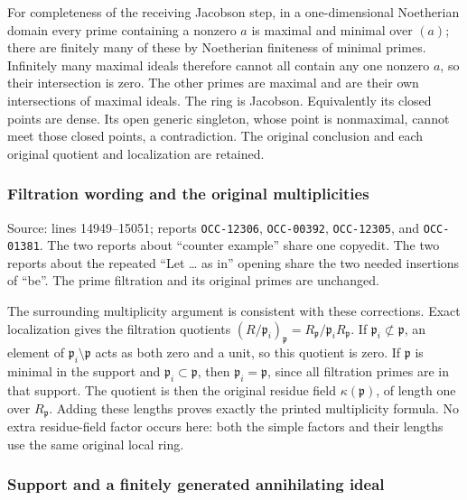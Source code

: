 For completeness of the receiving Jacobson step, in a one-dimensional Noetherian domain every prime containing a nonzero \(a\) is maximal and minimal over \((a)\); there are finitely many of these by Noetherian finiteness of minimal primes. Infinitely many maximal ideals therefore cannot all contain any one nonzero \(a\), so their intersection is zero. The other primes are maximal and are their own intersections of maximal ideals. The ring is Jacobson. Equivalently its closed points are dense. Its open generic singleton, whose point is nonmaximal, cannot meet those closed points, a contradiction. The original conclusion and each original quotient and localization are retained.

\subsubsection{Filtration wording and the original multiplicities}\label{filtration-wording-and-the-original-multiplicities}

Source: lines 14949--15051; reports \texttt{OCC-12306}, \texttt{OCC-00392}, \texttt{OCC-12305}, and \texttt{OCC-01381}. The two reports about ``counter example'' share one copyedit. The two reports about the repeated ``Let \ldots{} as in'' opening share the two needed insertions of ``be''. The prime filtration and its original primes are unchanged.

The surrounding multiplicity argument is consistent with these corrections. Exact localization gives the filtration quotients \((R/\mathfrak p_i)_{\mathfrak p}=R_{\mathfrak p}/\mathfrak p_iR_{\mathfrak p}\). If \(\mathfrak p_i\not\subset\mathfrak p\), an element of \(\mathfrak p_i\setminus\mathfrak p\) acts as both zero and a unit, so this quotient is zero. If \(\mathfrak p\) is minimal in the support and \(\mathfrak p_i\subset\mathfrak p\), then \(\mathfrak p_i=\mathfrak p\), since all filtration primes are in that support. The quotient is then the original residue field \(\kappa(\mathfrak p)\), of length one over \(R_{\mathfrak p}\). Adding these lengths proves exactly the printed multiplicity formula. No extra residue-field factor occurs here: both the simple factors and their lengths use the same original local ring.

\subsubsection{Support and a finitely generated annihilating ideal}\label{support-and-a-finitely-generated-annihilating-ideal}

